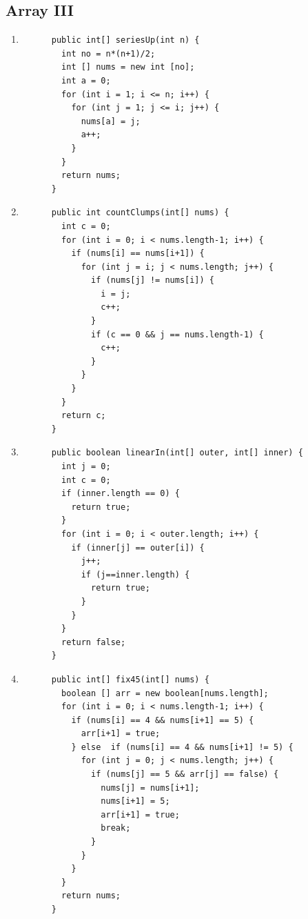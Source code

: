 \documentclass[a4paper,12pt]{article}
\begin{document}
    \subsection{Array III}
    \begin{enumerate}
      \item \begin{Verbatim}
      public int[] seriesUp(int n) {
        int no = n*(n+1)/2;
        int [] nums = new int [no];
        int a = 0;
        for (int i = 1; i <= n; i++) {
          for (int j = 1; j <= i; j++) {
            nums[a] = j;
            a++;
          }
        }
        return nums;
      }
      \end{Verbatim}

      \item\begin{Verbatim}
      public int countClumps(int[] nums) {
        int c = 0;
        for (int i = 0; i < nums.length-1; i++) {
          if (nums[i] == nums[i+1]) {
            for (int j = i; j < nums.length; j++) {
              if (nums[j] != nums[i]) {
                i = j;
                c++;
              }
              if (c == 0 && j == nums.length-1) {
                c++;
              }
            }
          }
        }
        return c;
      }
      \end{Verbatim}

      \item \begin{Verbatim}
      public boolean linearIn(int[] outer, int[] inner) {
        int j = 0;
        int c = 0;
        if (inner.length == 0) {
          return true;
        }
        for (int i = 0; i < outer.length; i++) {
          if (inner[j] == outer[i]) {
            j++;
            if (j==inner.length) {
              return true;
            }
          }
        }
        return false;
      }
      \end{Verbatim}

      \item \begin{Verbatim}
      public int[] fix45(int[] nums) {
        boolean [] arr = new boolean[nums.length];
        for (int i = 0; i < nums.length-1; i++) {
          if (nums[i] == 4 && nums[i+1] == 5) {
            arr[i+1] = true;
          } else  if (nums[i] == 4 && nums[i+1] != 5) {
            for (int j = 0; j < nums.length; j++) {
              if (nums[j] == 5 && arr[j] == false) {
                nums[j] = nums[i+1];
                nums[i+1] = 5;
                arr[i+1] = true;
                break;
              }
            }
          }
        }
        return nums;
      }
      \end{Verbatim}
    \end{enumerate}
\end{document}
